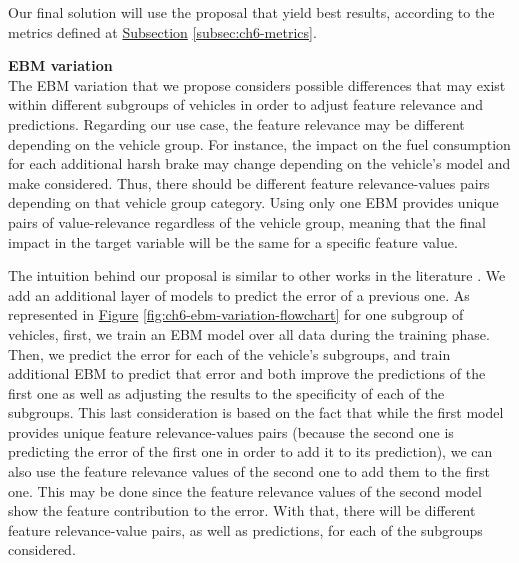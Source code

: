 Our final solution will use the proposal that yield best results, according to the metrics defined at \hyperref[subsec:ch6-metrics]{Subsection} \ref{subsec:ch6-metrics}. %

\textbf{EBM variation}\label{subsec:ch6-ebm-var-intro}\\
The EBM variation that we propose considers possible differences that may exist within different subgroups of vehicles in order to adjust feature relevance and predictions. Regarding our use case, the feature relevance may be different depending on the vehicle group. For instance, the impact on the fuel consumption for each additional harsh brake may change depending on the vehicle's model and make considered. Thus, there should be different feature relevance-values pairs depending on that vehicle group category. Using only one EBM provides unique pairs of value-relevance regardless of the vehicle group, meaning that the final impact in the target variable will be the same for a specific feature value.

The intuition behind our proposal is similar to other works in the literature \parencite{waeto2017forecasting}. We add an additional layer of models to predict the error of a previous one. As represented in \hyperref[fig:ch6-ebm-variation-flowchart]{Figure} \ref{fig:ch6-ebm-variation-flowchart} for one subgroup of vehicles, first, we train an EBM model over all data during the training phase. Then, we predict the error for each of the vehicle's subgroups, and train additional EBM to predict that error and both improve the predictions of the first one as well as adjusting the results to the specificity of each of the subgroups. This last consideration is based on the fact that while the first model provides unique feature relevance-values pairs (because the second one is predicting the error of the first one in order to add it to its prediction), we can also use the feature relevance values of the second one to add them to the first one. This may be done since the feature relevance values of the second model show the feature contribution to the error.
With that, there will be different feature relevance-value pairs, as well as predictions, for each of the subgroups considered.

